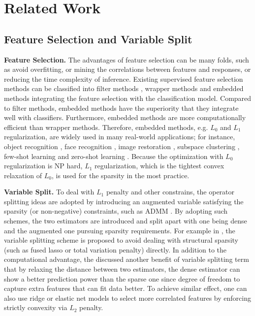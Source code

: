 \documentclass{article}
\begin{document}
\section{Related Work}


\subsection{Feature Selection and Variable Split}


\noindent \textbf{Feature Selection.} The advantages of feature selection
can be many folds, such as avoid overfitting, or mining the correlations
between features and responses, or reducing the time complexity of
inference. Existing supervised feature selection methods can be classified
into filter methods \citet{yu2003feature}, wrapper methods \citet{kabir2010new}
and embedded methods \citet{saeys2007review} integrating the feature
selection with the classification model. Compared to filter methods,
embedded methods have the superiority that they integrate well with
classifiers. Furthermore, embedded methods are more computationally
efficient than wrapper methods. Therefore, embedded methods, e.g.
$L_{0}$ and $L_{1}$ regularization, are widely used in many real-world
applications; for instance, object recognition \citet{kavukcuoglu2010fast},
face recognition \citet{wright2009robust}, image restoration \citet{mairal2009non},
subspace clustering \citet{elhamifar2009sparse}, few-shot learning
\citet{lee2015communication} and zero-shot learning \citet{kodirov2015unsupervised}.
Because the optimization with $L_{0}$ regularization is NP hard,
$L_{1}$ regularization, which is the tightest convex relaxation of
$L_{0}$, is used for the sparsity in the most practice.


\noindent \textbf{Variable Split.} To deal with $L_{1}$ penalty and
other constrains, the operator splitting ideas are adopted by introducing
an augmented variable satisfying the sparsity (or non-negative) constraints,
such as ADMM \citet{wahlberg2012admm,boyd2011distributed}. By adopting
such schemes, the two estimators are introduced and split apart with
one being dense and the augmented one pursuing sparsity requirements.
For example in \citet{ye2011split,Splitlbi}, the variable splitting
scheme is proposed to avoid dealing with structural sparsity (such
as fused lasso or total variation penalty) directly. In addition to
the computational advantage, the \citet{sun2017gsplit} discussed
another benefit of variable splitting term that by relaxing the distance
between two estimators, the dense estimator can show a better prediction
power than the sparse one since degree of freedom to capture extra
features that can fit data better.\textcolor{red}{{} }To achieve similar
effect, one can also use ridge or elastic net models \citet{zou2005regularization}
to select more correlated features by enforcing strictly convexity
via $L_{2}$ penalty.
\end{document}
